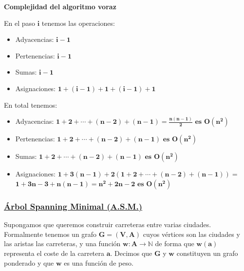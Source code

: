 \documentclass[ebook,oneside]{memoir}
\newcommand{\bolds}[1]{\boldsymbol{#1}}
\begin{document}
\textbf{Complejidad del algoritmo voraz}
\vspace{0.3cm}

        \noindent En el paso $\bolds{i}$ tenemos las operaciones:
        \begin{itemize}
        \item Adyacencias: $\bolds{i-1}$
        \item Pertenencias: $\bolds{i-1}$
        \item Sumas: $\bolds{i-1}$
        \item Asignaciones: $\bolds{1+(i-1)+1+(i-1)+1}$
        \end{itemize}
\vspace{0.3cm}
        \noindent En total tenemos:
        \begin{itemize}
        \item Adyacencias:
        $\bolds{1+2+\cdots+(n-2)+(n-1)=\frac{n(n-1)}{2} \mbox{  es  } O(n^2)}$
        \item Pertenencias: $\bolds{1+2+\cdots+(n-2)+(n-1)\mbox{  es  }O(n^2)}$
        \item Sumas: $\bolds{1+2+\cdots+(n-2)+(n-1) \mbox{  es  }O(n^2)}$
        \item Asignaciones: $\bolds{1+3(n-1)+2\left(1+2+\cdots+(n-2)+(n-1)\right)=}$\\
        $\bolds{1+3n-3+n(n-1)=n^2+2n-2 \mbox{  es  }O(n^2)}$
        \end{itemize}

\vspace{0.4cm}
\subsubsection{\underline{\'{A}rbol Spanning Minimal (A.S.M.)}}

Supongamos que queremos construir carreteras entre varias ciudades. Formalmente tenemos un grafo $\bolds{G=(V,A)}$ cuyos v\'{e}rtices son las ciudades y las aristas las carreteras, y una funci\'{o}n $\bolds{w:A\rightarrow\mathbb{N}}$ de forma que $\bolds{w(a)}$ representa el coste de la carretera $\bolds{a}$. Decimos que $\bolds{G}$ y $\bolds{w}$ constituyen un grafo ponderado y que $\bolds{w}$ es una funci\'{o}n de peso.
\vspace{0.2cm}
\end{document}
